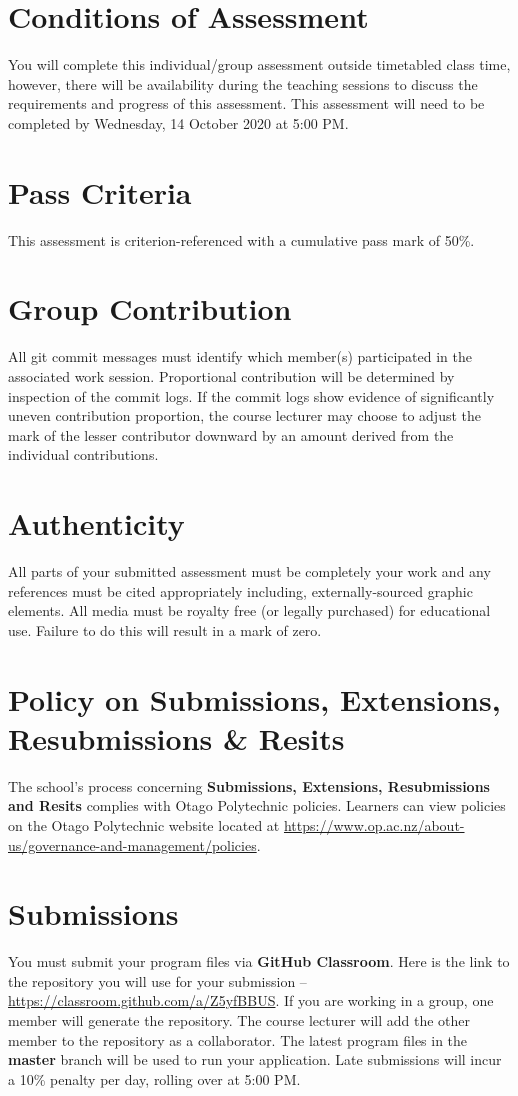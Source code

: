 \documentclass{article}
\begin{document}
\section*{Conditions of Assessment}
You will complete this individual/group assessment outside timetabled class time, however, there will be availability during the teaching sessions to discuss the requirements and progress of this assessment. This assessment will need to be completed by Wednesday, 14 October 2020 at 5:00 PM. 

\section*{Pass Criteria}
This assessment is criterion-referenced with a cumulative pass mark of 50\%.

\section*{Group Contribution}
All git commit messages must identify which member(s) participated in the associated work session. Proportional contribution will be determined by inspection of the commit logs. If the commit logs show evidence of significantly uneven contribution proportion, the course lecturer may choose to adjust the mark of the lesser contributor downward by an amount derived from the individual contributions.

\section*{Authenticity}
All parts of your submitted assessment must be completely your work and any references must be cited appropriately including, externally-sourced graphic elements. All media must be royalty free (or legally purchased) for educational use. Failure to do this will result in a mark of zero.

\section*{Policy on Submissions, Extensions, Resubmissions \& Resits}
The school's process concerning \textbf{Submissions, Extensions, Resubmissions and Resits} complies with Otago Polytechnic policies. Learners can view policies on the Otago Polytechnic website located at \href{https://www.op.ac.nz/about-us/governance-and-management/policies}{https://www.op.ac.nz/about-us/governance-and-management/policies}.

\section*{Submissions}
You must submit your program files via \textbf{GitHub Classroom}. Here is the link to the repository you will use for your submission – \href{https://classroom.github.com/a/Z5yfBBUS}{https://classroom.github.com/a/Z5yfBBUS}. If you are working in a group, one member will generate the repository. The course lecturer will add the other member to the repository as a collaborator. The latest program files in the \textbf{master} branch will be used to run your application. Late submissions will incur a 10\% penalty per day, rolling over at 5:00 PM.
\end{document}
